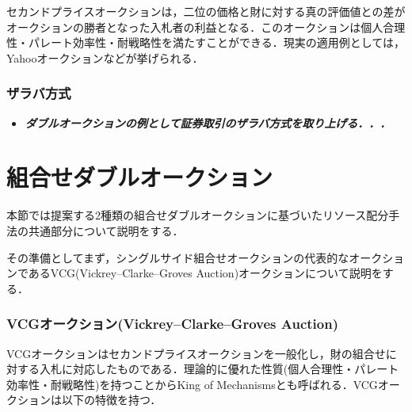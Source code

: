セカンドプライスオークションは，二位の価格と財に対する真の評価値との差がオークションの勝者となった入札者の利益となる．このオークションは個人合理性・パレート効率性・耐戦略性を満たすことができる．現実の適用例としては，Yahooオークションなどが挙げられる\cite{yahoo}．

\hypertarget{ux30b6ux30e9ux30d0ux65b9ux5f0f}{%
\subsubsection{ザラバ方式}\label{ux30b6ux30e9ux30d0ux65b9ux5f0f}}

\begin{itemize}
\tightlist
\item
  \textbf{\emph{ダブルオークションの例として証券取引のザラバ方式を取り上げる．．．}}
\end{itemize}

\hypertarget{ux7d44ux5408ux305bux30c0ux30d6ux30ebux30aaux30fcux30afux30b7ux30e7ux30f3}{%
\section{組合せダブルオークション}\label{ux7d44ux5408ux305bux30c0ux30d6ux30ebux30aaux30fcux30afux30b7ux30e7ux30f3}}

本節では提案する2種類の組合せダブルオークションに基づいたリソース配分手法の共通部分について説明をする．

その準備としてまず，シングルサイド組合せオークションの代表的なオークションであるVCG(Vickrey--Clarke--Groves
Auction)オークション\cite{vickrey}について説明をする．

\hypertarget{vcgux30aaux30fcux30afux30b7ux30e7ux30f3vickreyclarkegroves-auction}{%
\subsubsection{VCGオークション(Vickrey--Clarke--Groves
Auction)}\label{vcgux30aaux30fcux30afux30b7ux30e7ux30f3vickreyclarkegroves-auction}}

VCGオークションはセカンドプライスオークションを一般化し，財の組合せに対する入札に対応したものである．理論的に優れた性質(個人合理性・パレート効率性・耐戦略性)を持つことからKing
of Mechanismsとも呼ばれる．VCGオークションは以下の特徴を持つ．

